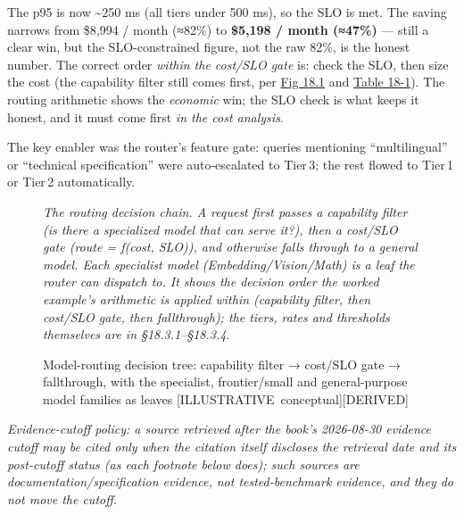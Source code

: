 The p95 is now \textasciitilde250 ms (all tiers under 500 ms), so the
SLO is met. The saving narrows from \$8,994 / month (≈82\%) to
\textbf{\$5,198 / month (≈47\%)} --- still a clear win, but the
SLO-constrained figure, not the raw 82\%, is the honest number. The
correct order \emph{within the cost/SLO gate} is: check the SLO, then
size the cost (the capability filter still comes first, per \hyperref[fig:18.1]{Fig 18.1} and
\hyperref[tab:18.1]{Table 18-1}). The routing arithmetic shows the \emph{economic} win; the
SLO check is what keeps it honest, and it must come first \emph{in the
cost analysis}.

The key enabler was the router's feature gate: queries mentioning
``multilingual'' or ``technical specification'' were auto‑escalated to
Tier\,3; the rest flowed to Tier\,1 or Tier\,2 automatically.

\begin{figure}
\centering
{}
\caption[Model-routing decision tree]{Model-routing decision tree: capability filter → cost/SLO gate → fallthrough, with the specialist, frontier/small and general-purpose model families as leaves \mbox{{[}ILLUSTRATIVE conceptual{]}}\hspace{0pt}\mbox{{[}DERIVED{]}}}

\label{fig:18.1}\emph{The routing decision chain. A request first passes a capability
filter (is there a specialized model that can serve it?), then a
cost/SLO gate (route = f(cost, SLO)), and otherwise falls through to a
general model. Each specialist model (Embedding/Vision/Math) is a leaf
the router can dispatch to. It shows the decision order the worked
example's arithmetic is applied within (capability filter, then cost/SLO
gate, then fallthrough); the tiers, rates and thresholds themselves are
in §18.3.1--§18.3.4.}

\end{figure}\emph{Evidence-cutoff policy: a source retrieved after the book's
2026-08-30 evidence cutoff may be cited only when the citation itself
discloses the retrieval date and its post-cutoff status (as each
footnote below does); such sources are documentation/specification
evidence, not tested-benchmark evidence, and they do not move the
cutoff.}
